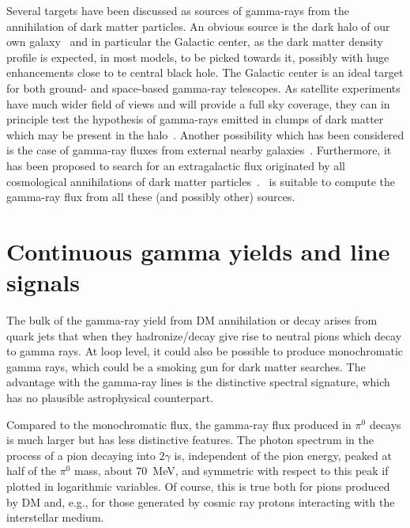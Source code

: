 Several targets have been discussed as sources of gamma-rays from the
annihilation of dark matter particles. An obvious source is the dark
halo of our own galaxy~\cite{Turner:1986vr,Ipser:1987ru,Freese:1989tg,Berezinsky:1994wva} and in particular the Galactic center,
as the dark matter density profile is expected, in most models, to be 
picked towards it, possibly with huge enhancements close to te central 
black hole. The Galactic center is an ideal target for both ground-
and space-based gamma-ray telescopes. As satellite experiments have 
much wider field of views and will provide a full sky coverage,
they can in principle test the hypothesis of gamma-rays emitted in clumps of dark 
matter which may be present in the 
halo~\cite{Lake:1990du,Silk:1992bh,CalcaneoRoldan:2000yt,Bergstrom:1998zs,Bergstrom:1998jj,Bergstrom:2000bk}. 
Another possibility which has been considered is the case of 
gamma-ray fluxes from external nearby galaxies~\cite{Baltz:1999ra}. 
Furthermore, it has 
been proposed to search for an extragalactic flux originated by all 
cosmological annihilations of dark matter 
particles~\cite{Cline:1990mr,Gao:1991rz,Bergstrom:2001jj}.
\ds\ is suitable to compute the gamma-ray flux from all these (and possibly 
other) sources. 

\section{Continuous gamma yields and line signals}

The bulk of the gamma-ray yield from DM annihilation or decay arises from quark 
jets that when they hadronize/decay give rise to neutral pions which decay to
gamma rays. At loop level, it could also be possible to produce monochromatic gamma rays, 
which could be a smoking gun for dark matter searches. The advantage with the gamma-ray lines 
is the distinctive spectral signature, which has no plausible astrophysical counterpart. 

Compared to the monochromatic flux, the gamma-ray flux produced in 
$\pi^0$ decays is much larger but has less distinctive features.
The photon spectrum in the process of a pion decaying into $2\gamma$ is, 
independent of the pion energy, peaked at half of the $\pi^0$ mass, 
about 70~MeV, and symmetric with respect to this peak if plotted in 
logarithmic variables. Of course, this is true both for pions produced by DM 
and, e.g., for those generated by cosmic ray protons interacting with the interstellar medium.

